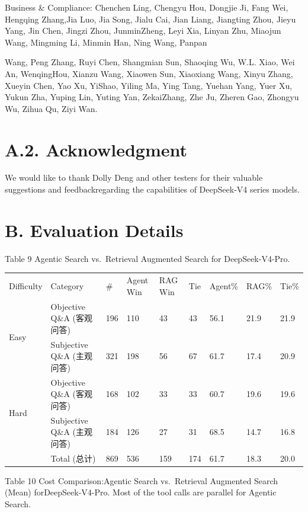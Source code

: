 \documentclass[
  10
]{article}
\newcounter{none} %
\begin{document}
Business \& Compliance: Chenchen Ling, Chengyu Hou, Dongjie Ji, Fang
Wei, Hengqing Zhang,Jia Luo, Jia Song, Jialu Cai, Jian Liang, Jiangting
Zhou, Jieyu Yang, Jin Chen, Jingzi Zhou, JunminZheng, Leyi Xia, Linyan
Zhu, Miaojun Wang, Mingming Li, Minmin Han, Ning Wang, Panpan

Wang, Peng Zhang, Ruyi Chen, Shangmian Sun, Shaoqing Wu, W.L. Xiao, Wei
An, WenqingHou, Xianzu Wang, Xiaowen Sun, Xiaoxiang Wang, Xinyu Zhang,
Xueyin Chen, Yao Xu, YiShao, Yiling Ma, Ying Tang, Yuehan Yang, Yuer Xu,
Yukun Zha, Yuping Lin, Yuting Yan, ZekaiZhang, Zhe Ju, Zheren Gao,
Zhongyu Wu, Zihua Qu, Ziyi Wan.

\section{A.2. Acknowledgment}\label{a.2.-acknowledgment}

We would like to thank Dolly Deng and other testers for their valuable
suggestions and feedbackregarding the capabilities of DeepSeek-V4 series
models.

\section{B. Evaluation Details}\label{b.-evaluation-details}

Table 9 \textbar{} Agentic Search vs.~Retrieval Augmented Search for
DeepSeek-V4-Pro.

{\def\LTcaptype{none} %
\begin{longtable}[]{@{}lllllllll@{}}
\toprule\noalign{}
\endhead
\bottomrule\noalign{}
\endlastfoot
Difficulty & Category & \# & Agent Win & RAG Win & Tie & Agent\% & RAG\%
& Tie\% \\
\multirow{2}{*}{Easy} & Objective Q\&A (客观问答) & 196 & 110 & 43 & 43
& 56.1 & 21.9 & 21.9 \\
& Subjective Q\&A (主观问答) & 321 & 198 & 56 & 67 & 61.7 & 17.4 &
20.9 \\
\multirow{2}{*}{Hard} & Objective Q\&A (客观问答) & 168 & 102 & 33 & 33
& 60.7 & 19.6 & 19.6 \\
& Subjective Q\&A (主观问答) & 184 & 126 & 27 & 31 & 68.5 & 14.7 &
16.8 \\
& Total (总计) & 869 & 536 & 159 & 174 & 61.7 & 18.3 & 20.0 \\
\end{longtable}
}

Table 10 \textbar{} Cost Comparison:Agentic Search vs.~Retrieval
Augmented Search (Mean) forDeepSeek-V4-Pro. Most of the tool calls are
parallel for Agentic Search.
\end{document}
